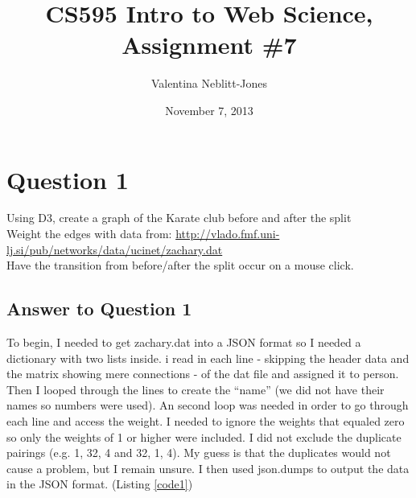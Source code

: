 \documentclass{article}
\begin{document}
\title{CS595 Intro to Web Science, Assignment \#7}
\author{Valentina Neblitt-Jones}
\date{November 7, 2013}
\maketitle



\section*{Question 1}

Using D3, create a graph of the Karate club before and after the split \\

Weight the edges with data from: \url{http://vlado.fmf.uni-lj.si/pub/networks/data/ucinet/zachary.dat} \\

Have the transition from before/after the split occur on a mouse click.  \\


\subsection*{Answer to Question 1}

To begin, I needed to get zachary.dat into a JSON format so I needed a dictionary with two lists inside. i read in each line - skipping the header data and the matrix showing mere connections - of the dat file and assigned it to person. Then I looped through the lines to create the ``name'' (we did not have their names so numbers were used). An second loop was needed in order to go through each line and access the weight.  I needed to ignore the weights that equaled zero so only the weights of 1 or higher were included. I did not exclude the duplicate pairings (e.g. 1, 32, 4 and 32, 1, 4). My guess is that the duplicates would not cause a problem, but I remain unsure. I then used json.dumps to output the data in the JSON format. (Listing \ref{code1})
\end{document}
